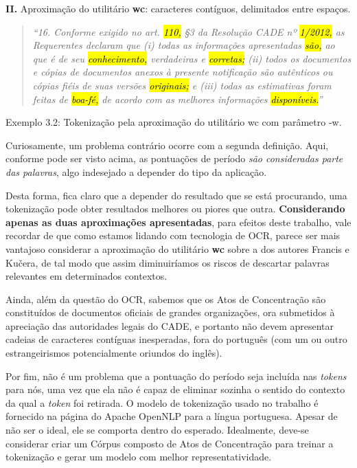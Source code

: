 \documentclass[11pt]{report}
\newcommand{\quotes}[1]{``#1''}
\begin{document}
\textbf{II.} Aproximação do utilitário \textbf{wc}: caracteres contíguos, delimitados entre espaços.

\begin{quote}
  \textit{\quotes{16. Conforme exigido no art. \hl{110,} §3 da Resolução CADE nº \hl{1/2012,} as Requerentes declaram que (i) todas as informações apresentadas \hl{\mbox{são,}} ao que é de seu
  \hl{conhecimento,} verdadeiras e \hl{corretas;} (ii) todos os documentos e cópias de documentos anexos à presente notificação são autênticos ou cópias fiéis de suas versões \hl{originais;}
  e (iii) todas as estimativas foram feitas de \hl{\mbox{boa-fé,}} de acordo com as melhores informações \hl{\mbox{disponíveis.}}}}
\end{quote}
\begin{center}
  Exemplo 3.2: Tokenização pela aproximação do utilitário wc com parâmetro -w.
\end{center}

Curiosamente, um problema contrário ocorre com a segunda definição. Aqui, conforme pode ser visto acima, as pontuações de período \textit{são consideradas parte das palavras}, algo
indesejado a depender do tipo da aplicação.

Desta forma, fica claro que a depender do resultado que se está procurando, uma tokenização pode obter resultados melhores ou piores que outra. 
\textbf{Considerando apenas as duas aproximações apresentadas}, para efeitos deste trabalho,
vale recordar de que como estamos lidando com tecnologia de OCR, parece ser mais vantajoso considerar a aproximação do utilitário \textbf{wc} sobre a dos autores
Francis e Kučera, de tal modo que assim diminuiríamos os riscos de descartar palavras relevantes em determinados contextos.

Ainda, além da questão do OCR, sabemos que os Atos de Concentração são constituídos de documentos oficiais de grandes organizações, ora submetidos à apreciação das
autoridades legais do CADE, e portanto não devem apresentar cadeias de caracteres contíguas inesperadas, fora do português (com um ou outro estrangeirismos
potencialmente oriundos do inglês).

Por fim, não é um problema que a pontuação do período seja incluída nas \textit{tokens} para nós, uma vez que ela não é capaz de eliminar sozinha o sentido do contexto da qual
a \textit{token} foi retirada. O modelo de tokenização usado no trabalho é fornecido na página do Apache OpenNLP para a língua portuguesa. Apesar de não ser o ideal, ele se comporta
dentro do esperado. Idealmente, deve-se considerar criar um Córpus composto de Atos de Concentração para treinar a tokenização e gerar um modelo com melhor representatividade.
\end{document}
